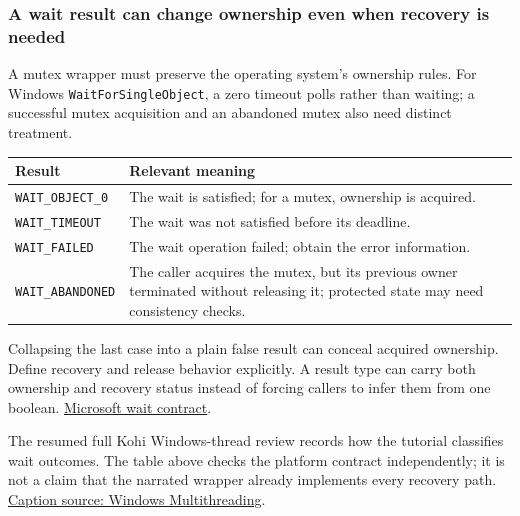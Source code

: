 \subsubsection{A wait result can change ownership even when recovery is needed}\label{05-engine-i-ch013-a-wait-result-can-change-ownership-even-when-recovery-is-needed}

A mutex wrapper must preserve the operating system's ownership rules. For Windows \texttt{WaitForSingleObject}, a zero timeout polls rather than waiting; a successful mutex acquisition and an abandoned mutex also need distinct treatment.

{\def\LTcaptype{none} %
\begin{longtable}[]{@{}
  >{\raggedright\arraybackslash}p{}
  >{\raggedright\arraybackslash}p{}@{}}
\toprule\noalign{}
\begin{minipage}[b]{\linewidth}\raggedright
Result
\end{minipage} & \begin{minipage}[b]{\linewidth}\raggedright
Relevant meaning
\end{minipage} \\
\midrule\noalign{}
\endhead
\bottomrule\noalign{}
\endlastfoot
\texttt{WAIT\_OBJECT\_0} & The wait is satisfied; for a mutex, ownership is acquired. \\
\texttt{WAIT\_TIMEOUT} & The wait was not satisfied before its deadline. \\
\texttt{WAIT\_FAILED} & The wait operation failed; obtain the error information. \\
\texttt{WAIT\_ABANDONED} & The caller acquires the mutex, but its previous owner terminated without releasing it; protected state may need consistency checks. \\
\end{longtable}
}

Collapsing the last case into a plain false result can conceal acquired ownership. Define recovery and release behavior explicitly. A result type can carry both ownership and recovery status instead of forcing callers to infer them from one boolean. \href{https://learn.microsoft.com/en-us/windows/win32/api/synchapi/nf-synchapi-waitforsingleobject}{Microsoft wait contract}.

The resumed full Kohi Windows-thread review records how the tutorial classifies wait outcomes. The table above checks the platform contract independently; it is not a claim that the narrated wrapper already implements every recovery path. \href{https://www.youtube.com/watch?v=jmt_BE6ny1g}{Caption source: Windows Multithreading}.

